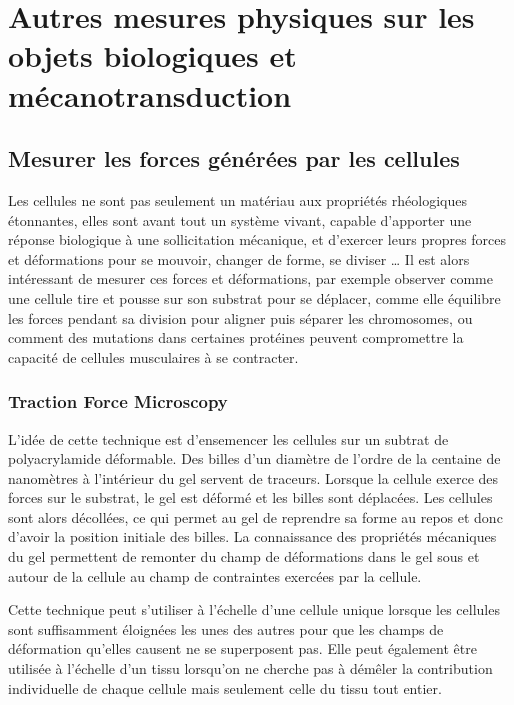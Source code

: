 \documentclass{report}
\begin{document}
\section{Autres mesures physiques sur les objets biologiques et mécanotransduction}

 



\subsection{Mesurer les forces générées par les cellules}

Les cellules ne sont pas seulement un matériau aux propriétés rhéologiques étonnantes, elles sont avant tout un système vivant, capable d'apporter une réponse biologique à une sollicitation mécanique, et d'exercer leurs propres forces et déformations pour se mouvoir, changer de forme, se diviser \dots 
Il est alors intéressant de mesurer ces forces et déformations, par exemple observer comme une cellule tire et pousse sur son substrat pour se déplacer, comme elle équilibre les forces pendant sa division pour aligner puis séparer les chromosomes, ou comment des mutations dans certaines protéines peuvent compromettre la capacité de cellules musculaires à se contracter.

\subsubsection{Traction Force Microscopy}

L'idée de cette technique est d'ensemencer les cellules sur un subtrat de polyacrylamide déformable. 
Des billes d'un diamètre de l'ordre de la centaine de nanomètres à l'intérieur du gel servent de traceurs. 
Lorsque la cellule exerce des forces sur le substrat, le gel est déformé et les billes sont déplacées. 
Les cellules sont alors décollées, ce qui permet au gel de reprendre sa forme au repos et donc d'avoir la position initiale des billes. 
La connaissance des propriétés mécaniques du gel permettent de remonter du champ de déformations dans le gel sous et autour de la cellule au champ de contraintes exercées par la cellule. 

Cette technique peut s'utiliser à l'échelle d'une cellule unique lorsque les cellules sont suffisamment éloignées les unes des autres pour que les champs de déformation qu'elles causent ne se superposent pas. 
Elle peut également être utilisée à l'échelle d'un tissu lorsqu'on ne cherche pas à démêler la contribution individuelle de chaque cellule mais seulement celle du tissu tout entier. 
\end{document}
